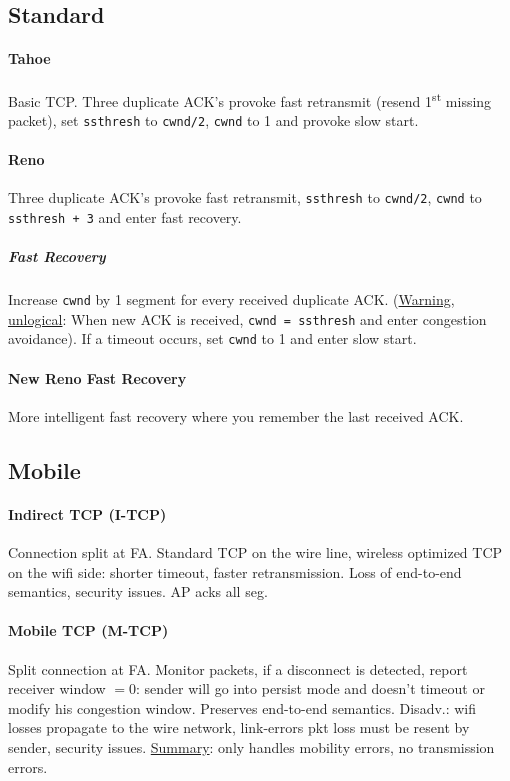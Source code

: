 \documentclass[6pt]{scrartcl}
\begin{document}
\begin{multicols}{4}
\subsection{Standard}

\paragraph{Tahoe} Basic TCP. Three duplicate ACK's provoke fast retransmit (resend 1\textsuperscript{st} missing packet), set \texttt{ssthresh} to \texttt{cwnd/2}, \texttt{cwnd} to 1 and provoke slow start.

\paragraph{Reno} Three duplicate ACK's provoke fast retransmit, \texttt{ssthresh} to \texttt{cwnd/2}, \texttt{cwnd} to \texttt{ssthresh + 3} and enter fast recovery.

\subparagraph{Fast Recovery} Increase \texttt{cwnd} by 1 segment for every received duplicate ACK. (\underline{Warning, unlogical}: When new ACK is received, \texttt{cwnd = ssthresh} and enter congestion avoidance). If a timeout occurs, set \texttt{cwnd} to 1 and enter slow start.
\paragraph{New Reno Fast Recovery} More intelligent fast recovery where you remember the last received ACK.

\subsection{Mobile}
\paragraph{Indirect TCP (I-TCP)} Connection split at FA. Standard TCP on the wire line, wireless optimized TCP on the wifi side: shorter timeout, faster retransmission. Loss of end-to-end semantics, security issues. AP acks all seg.
\paragraph{Mobile TCP (M-TCP)} Split connection at FA. Monitor packets, if a disconnect is detected, report receiver window $= 0$: sender will go into persist mode and doesn't timeout or modify his congestion window. Preserves end-to-end semantics. Disadv.: wifi losses propagate to the wire network, link-errors pkt loss must be resent by sender, security issues. \underline{Summary}: only handles mobility errors, no transmission errors.


\end{multicols}
\end{document}
